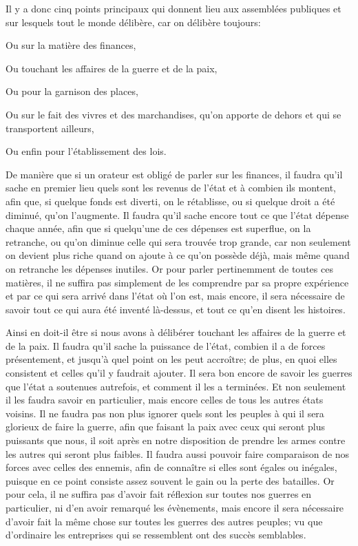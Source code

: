 \bigbreak

Il y a donc cinq points principaux qui donnent lieu aux assemblées publiques et sur lesquels tout le monde délibère, car
on délibère toujours:

\begin{emphpar}
	Ou sur la matière des finances,

	Ou touchant les affaires de la guerre et de la paix, 

	Ou pour la garnison des places, 

	Ou sur le fait des vivres et des marchandises, qu'on apporte de dehors et qui se transportent ailleurs,

	Ou enfin pour l'établissement des lois.
\end{emphpar}

De manière que si un orateur est obligé de parler sur les finances, il faudra qu'il sache en premier lieu quels sont les
revenus de l'état et à combien ils montent, afin que, si quelque fonds est diverti, on le rétablisse, ou si quelque droit a
été diminué, qu'on l'augmente. Il faudra qu'il sache encore tout ce que l'état dépense chaque année, afin que si quelqu'une
de ces dépenses est superflue, on la retranche, ou qu'on diminue celle qui sera trouvée trop grande, car non seulement on
devient plus riche quand on ajoute à ce qu'on possède déjà, mais même quand on retranche les dépenses inutiles. Or pour parler
pertinemment de toutes ces matières, il ne suffira pas simplement de les comprendre par sa propre expérience et par ce qui
sera arrivé dans l'état où l'on est, mais encore, il sera nécessaire de savoir tout ce qui aura été inventé là-dessus, et tout
ce qu'en disent les histoires.

Ainsi en doit-il être si nous avons à délibérer touchant les affaires de la guerre et de la paix. Il faudra qu'il sache la
puissance de l'état, combien il a de forces présentement, et jusqu'à quel point on les peut accroître; de plus, en quoi elles
consistent et celles qu'il y faudrait ajouter. Il sera bon encore de savoir les guerres que l'état a soutenues autrefois, et
comment il les a terminées. Et non seulement il les faudra savoir en particulier, mais encore celles de tous les autres états
voisins. Il ne faudra pas non plus ignorer quels sont les peuples à qui il sera glorieux de faire la guerre, afin que faisant
la paix avec ceux qui seront plus puissants que nous, il soit après en notre disposition de prendre les armes contre les autres
qui seront plus faibles. Il faudra aussi pouvoir faire comparaison de nos forces avec celles des ennemis, afin de connaître si
elles sont égales ou inégales, puisque en ce point consiste assez souvent le gain ou la perte des batailles. Or pour cela, il ne
suffira pas d'avoir fait réflexion sur toutes nos guerres en particulier, ni d'en avoir remarqué les évènements, mais encore il
sera nécessaire d'avoir fait la même chose sur toutes les guerres des autres peuples; vu que d'ordinaire les entreprises qui se
ressemblent ont des succès semblables.

